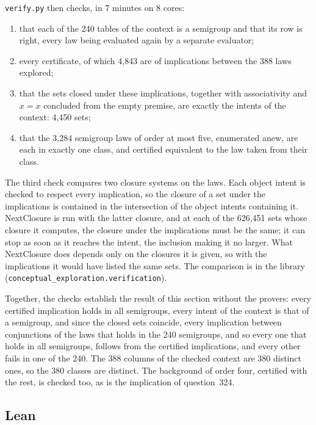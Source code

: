 \documentclass[11pt,a4paper]{article}
\theoremstyle{definition}
\theoremstyle{remark}
\newcommand{\code}[1]{\texttt{#1}}
\begin{document}
\code{verify.py} then checks, in 7 minutes on 8 cores:
\begin{enumerate}
  \item that each of the 240 tables of the context is a semigroup and that its row is right, every law being evaluated again by a separate evaluator;
  \item every certificate, of which 4,843 are of implications between the 388 laws explored;
  \item that the sets closed under these implications, together with associativity and $x = x$ concluded from the empty premise, are exactly the intents of the context: 4,450 sets;
  \item that the 3,284 semigroup laws of order at most five, enumerated anew, are each in exactly one class, and certified equivalent to the law taken from their class.
\end{enumerate}
The third check compares two closure systems on the laws. Each object intent is checked to respect every implication, so the closure of a set under the implications is contained in the intersection of the object intents containing it. NextClosure is run with the latter closure, and at each of the 626,451 sets whose closure it computes, the closure under the implications must be the same; it can stop as soon as it reaches the intent, the inclusion making it no larger. What NextClosure does depends only on the closures it is given, so with the implications it would have listed the same sets. The comparison is in the library (\code{conceptual\_exploration.verification}).

Together, the checks establish the result of this section without the provers: every certified implication holds in all semigroups, every intent of the context is that of a semigroup, and since the closed sets coincide, every implication between conjunctions of the laws that holds in the 240 semigroups, and so every one that holds in all semigroups, follows from the certified implications, and every other fails in one of the 240. The 388 columns of the checked context are 380 distinct ones, so the 380 classes are distinct. The background of order four, certified with the rest, is checked too, as is the implication of question~324.

\subsection{Lean}\label{sec:lean5}
\end{document}
